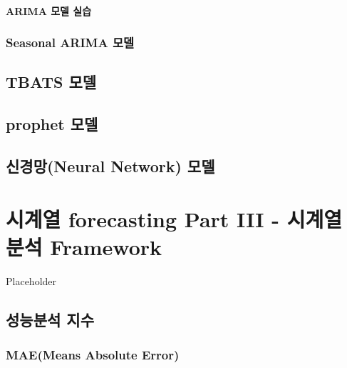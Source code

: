 \documentclass[
]{book}
\begin{document}
\hypertarget{arima-uxbaa8uxb378-uxc2e4uxc2b5}{%
\subsubsection{ARIMA 모델 실습}\label{arima-uxbaa8uxb378-uxc2e4uxc2b5}}

\hypertarget{seasonal-arima-uxbaa8uxb378}{%
\subsection{Seasonal ARIMA 모델}\label{seasonal-arima-uxbaa8uxb378}}

\hypertarget{tbats-uxbaa8uxb378}{%
\section{TBATS 모델}\label{tbats-uxbaa8uxb378}}

\hypertarget{prophet-uxbaa8uxb378}{%
\section{prophet 모델}\label{prophet-uxbaa8uxb378}}

\hypertarget{uxc2e0uxacbduxb9ddneural-network-uxbaa8uxb378}{%
\section{신경망(Neural Network) 모델}\label{uxc2e0uxacbduxb9ddneural-network-uxbaa8uxb378}}

\hypertarget{uxc2dcuxacc4uxc5f4-forecasting-part-iii---uxc2dcuxacc4uxc5f4-uxbd84uxc11d-framework}{%
\chapter{시계열 forecasting Part III - 시계열 분석 Framework}\label{uxc2dcuxacc4uxc5f4-forecasting-part-iii---uxc2dcuxacc4uxc5f4-uxbd84uxc11d-framework}}

Placeholder

\hypertarget{uxc131uxb2a5uxbd84uxc11d-uxc9c0uxc218}{%
\section{성능분석 지수}\label{uxc131uxb2a5uxbd84uxc11d-uxc9c0uxc218}}

\hypertarget{maemeans-absolute-error}{%
\subsection{MAE(Means Absolute Error)}\label{maemeans-absolute-error}}
\end{document}
